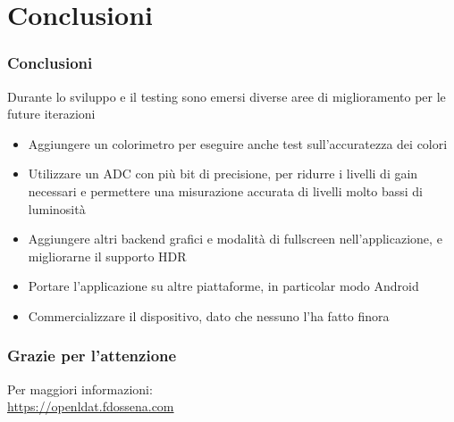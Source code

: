 \documentclass[xcolor={x11names}]{beamer}
\begin{document}
\section{Conclusioni}
\begin{frame}
	\frametitle{Conclusioni}
	Durante lo sviluppo e il testing sono emersi diverse aree di miglioramento per le future iterazioni
	\begin{itemize}
		\item Aggiungere un \alert{colorimetro} per eseguire anche test sull'accuratezza dei colori
		\item Utilizzare un \alert{ADC con più bit} di precisione, per ridurre i livelli di gain necessari e permettere una misurazione accurata di livelli molto bassi di luminosità
		\item Aggiungere \alert{altri backend grafici e modalità di fullscreen} nell'applicazione, e \alert{migliorarne il supporto HDR}
		\item \alert{Portare l'applicazione} su altre piattaforme, in particolar modo Android
		\item \alert{Commercializzare il dispositivo}, dato che nessuno l'ha fatto finora
	\end{itemize}
\end{frame}
\begin{frame}
	\frametitle{Grazie per l'attenzione}
	\centering
	Per maggiori informazioni:\\
	\alert{\url{https://openldat.fdossena.com}}
\end{frame}
\end{document}
